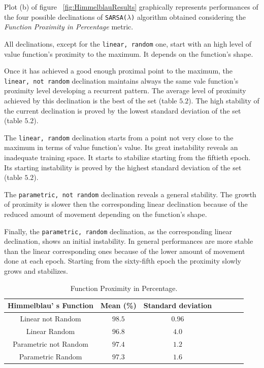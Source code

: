 Plot (b) of figure ~\ref{fig:HimmelblauResults} graphically represents performances of the four possible declinations of {\tt SARSA($\lambda$)} algorithm obtained considering the \textit{Function Proximity in Percentage} metric.

All declinations, except for the {\tt linear, random} one, start with an high level of value function's proximity to the maximum. It depends on the function's shape. 

Once it has achieved a good enough proximal point to the maximum, the {\tt linear, not random} declination maintains always the same vale function's proximity level developing a recurrent pattern. The average level of proximity achieved by this declination is the best of the set (table $5.2$). The high stability of the current declination is proved by the lowest standard deviation of the set (table $5.2$). 

The {\tt linear, random} declination starts from a point not very close to the maximum in terms of value function's value. Its great instability reveals an inadequate training space. It starts to stabilize starting from the fiftieth epoch. Its starting instability is proved by the highest standard deviation of the set (table $5.2$).

The {\tt parametric, not random} declination reveals a general stability. The growth of proximity is slower then the corresponding linear declination because of the reduced amount of movement depending on the function's shape. 

Finally, the {\tt parametric, random} declination, as the corresponding linear declination, shows an initial instability. In general performances are more stable than the linear corresponding ones because of the lower amount of movement done at each epoch. Starting from the sixty-fifth epoch the proximity slowly grows and stabilizes. \\

\begin{table} [h!]
	\centering
	\resizebox{\linewidth}{!} {
	\begin{tabular}{c| cccccc} 
		\hline \textbf{Himmelblau' s Function}
		& \textbf{Mean (\%)} & \textbf{Standard deviation}  \\ 
		\hline Linear not Random
		& \cellcolor{green!25}$98.5$ & \cellcolor{green!25}$0.96$  \\ 
		\hline Linear Random
		& $96.8$ & $4.0$ \\ 
		\hline Parametric not Random
		& $97.4$ & $1.2$ \\ 
		\hline Parametric Random
		& $97.3$ & $1.6$ \\ 
		\hline 
	\end{tabular}
}
\label{HimmelblauTabProximity}
\caption{Function Proximity in Percentage.} 
\end{table}

